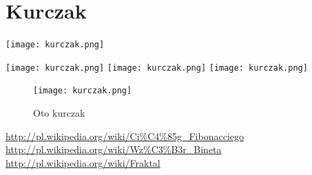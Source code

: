 \documentclass[a4paper,10pt,notitlepage]{report}
\begin{document}
\section{Kurczak}
\label{sec;sec4.2}
\begin{center}
\begin{turn}{30}
\texttt{[image: kurczak.png]}
\end{turn}
\texttt{[image: kurczak.png]}
\texttt{[image: kurczak.png]}
\texttt{[image: kurczak.png]}
\end{center}
\begin{figure}[h!]
  \caption{Oto kurczak}
  \centering
    \texttt{[image: kurczak.png]}
\end{figure}


\begin{thebibliography}{1}

\url{http://pl.wikipedia.org/wiki/Ci%C4%85g_Fibonacciego}
\url{http://pl.wikipedia.org/wiki/Wz%C3%B3r_Bineta}
\url{http://pl.wikipedia.org/wiki/Fraktal}

\end{thebibliography}
\end{document}
